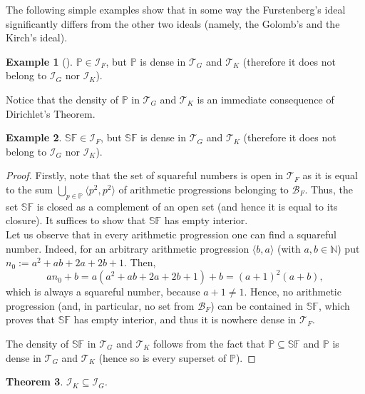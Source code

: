\documentclass{amsart}
\newtheorem{thm}{Theorem}[section]
\theoremstyle{definition}
\newtheorem{ex}[thm]{Example}
\newcommand{\N}{{\mathbb N}}
\newcommand{\I}{\mathcal I}
\newcommand{\T}{\mathcal{T}}
\newcommand{\B}{\mathcal{B}}
\newcommand{\SqrFr}{\mathbb{SF}}
\newcommand{\arithseq}[2]{\langle#2, #1\rangle}
\begin{document}
The following simple examples show that in some way the Furstenberg's ideal significantly differs from the other two ideals (namely, the Golomb's and the Kirch's ideal).

\begin{ex}[{\cite[Section 5]{Szczuka4}}] \label{primes}
$\mathbb{P}\in \I_F$, but $\mathbb{P}$ is dense in $\T_G$ and $\T_K$ (therefore it does not belong to $\I_G$ nor $\I_K$).
\end{ex}

Notice that the density of $\mathbb{P}$ in $\T_G$ and $\T_K$ is an immediate consequence of Dirichlet's Theorem.

\begin{ex}\label{exSqrFr} 
$\SqrFr\in \I_F$, but $\SqrFr$ is dense in $\T_G$ and $\T_K$ (therefore it does not belong to $\I_G$ nor $\I_K$).
\end{ex}

\begin{proof}
Firstly, note that the set of squareful numbers is open in $\T_F$ as it is equal to the sum $\bigcup_{p\in\mathbb{P}}{\arithseq{p^2}{p^2}}$ of arithmetic progressions belonging to $\B_F$. Thus, the set $\SqrFr$ is closed as a complement of an open set (and hence it is equal to its closure). It suffices to show that $\SqrFr$ has empty interior.\\
Let us observe that in every arithmetic progression one can find a squareful number. Indeed, for an arbitrary arithmetic progression $\arithseq{a}{b}$ (with $a,b\in\N$) put $n_0 := a^2 +ab+2a+2b+1$. 
Then,
$$an_0 +b = a(a^2 +ab+2a+2b+1)+b = (a+1)^2 (a+b),$$
which is always a squareful number, because $a+1  \neq 1$. Hence, no arithmetic progression (and, in particular, no set from $\B_F$) can be contained in $\SqrFr$, which proves that $\SqrFr$ has empty interior, and thus it is nowhere dense in $\T_F$.

The density of $\SqrFr$ in $\T_G$ and $\T_K$ follows from the fact that $\mathbb{P}\subseteq \SqrFr$ and $\mathbb{P}$ is dense in $\T_G$ and $\T_K$ (hence so is every superset of $\mathbb{P}$).
\end{proof}

\begin{thm}
$\I_K \subseteq \I_G$.
\end{thm}
\end{document}
